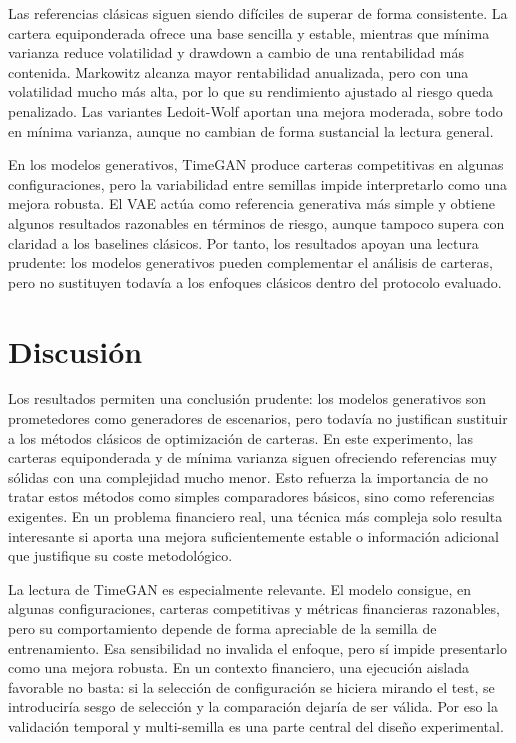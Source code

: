 \documentclass[11pt,a4paper,spanish,oneside]{book}
\numberwithin{equation}{chapter}
\numberwithin{figure}{chapter}
\begin{document}
Las referencias clásicas siguen siendo difíciles de superar de forma consistente. La cartera equiponderada ofrece una base sencilla y estable, mientras que mínima varianza reduce volatilidad y drawdown a cambio de una rentabilidad más contenida. Markowitz alcanza mayor rentabilidad anualizada, pero con una volatilidad mucho más alta, por lo que su rendimiento ajustado al riesgo queda penalizado. Las variantes Ledoit-Wolf aportan una mejora moderada, sobre todo en mínima varianza, aunque no cambian de forma sustancial la lectura general.

En los modelos generativos, TimeGAN produce carteras competitivas en algunas configuraciones, pero la variabilidad entre semillas impide interpretarlo como una mejora robusta. El VAE actúa como referencia generativa más simple y obtiene algunos resultados razonables en términos de riesgo, aunque tampoco supera con claridad a los baselines clásicos. Por tanto, los resultados apoyan una lectura prudente: los modelos generativos pueden complementar el análisis de carteras, pero no sustituyen todavía a los enfoques clásicos dentro del protocolo evaluado.

\section{Discusión}

Los resultados permiten una conclusión prudente: los modelos generativos son prometedores como generadores de escenarios, pero todavía no justifican sustituir a los métodos clásicos de optimización de carteras. En este experimento, las carteras equiponderada y de mínima varianza siguen ofreciendo referencias muy sólidas con una complejidad mucho menor. Esto refuerza la importancia de no tratar estos métodos como simples comparadores básicos, sino como referencias exigentes. En un problema financiero real, una técnica más compleja solo resulta interesante si aporta una mejora suficientemente estable o información adicional que justifique su coste metodológico.

La lectura de TimeGAN es especialmente relevante. El modelo consigue, en algunas configuraciones, carteras competitivas y métricas financieras razonables, pero su comportamiento depende de forma apreciable de la semilla de entrenamiento. Esa sensibilidad no invalida el enfoque, pero sí impide presentarlo como una mejora robusta. En un contexto financiero, una ejecución aislada favorable no basta: si la selección de configuración se hiciera mirando el test, se introduciría sesgo de selección y la comparación dejaría de ser válida. Por eso la validación temporal y multi-semilla es una parte central del diseño experimental.
\end{document}
